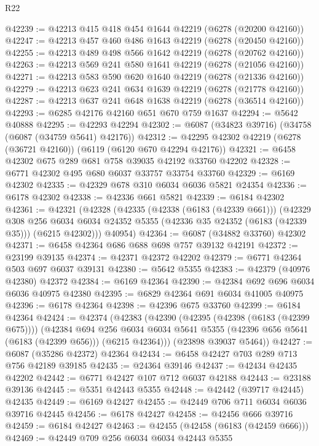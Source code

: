 \begin{lexlean}{R22}
\begin{coremodule}
@42239 := @42213 @415 @418 @454 @1644 @42219 (@6278 (@20200 @42160))
@42247 := @42213 @457 @460 @486 @1643 @42219 (@6278 (@20450 @42160))
@42255 := @42213 @489 @498 @566 @1642 @42219 (@6278 (@20762 @42160))
@42263 := @42213 @569 @241 @580 @1641 @42219 (@6278 (@21056 @42160))
@42271 := @42213 @583 @590 @620 @1640 @42219 (@6278 (@21336 @42160))
@42279 := @42213 @623 @241 @634 @1639 @42219 (@6278 (@21778 @42160))
@42287 := @42213 @637 @241 @648 @1638 @42219 (@6278 (@36514 @42160))
@42293 := @6285 @42176 @42160 @651 @670 @759 @1637
@42294 := @5642 @40888
@42295 := @42293 @42294
@42302 := @6087 (@34823 @39716) (@34758 (@6087 (@34759 @5641) @42176))
@42312 := @42295 @42302 @42219 (@6278 (@36721 @42160)) (@6119 (@6120 @670 @42294 @42176))
@42321 := @6458 @42302 @675 @289 @681 @758 @39035 @42192 @33760 @42202
@42328 := @6771 @42302 @495 @680 @6037 @33757 @33754 @33760
@42329 := @6169 @42302
@42335 := @42329 @678 @310 @6034 @6036 @5821 @24354
@42336 := @6178 @42302
@42338 := @42336 @661 @5821
@42339 := @6184 @42302
@42361 := @42321
    (@42328
      (@42335
        (@42338 (@6183 (@42339 @661)))
        (@42329
          @308
          @256
          @6034
          @6034
          @24352
          @5355
          (@42336 @35 @24352 (@6183 (@42339 @35)))
          (@6215 @42302)))
      @40954)
@42364 := @6087 (@34882 @33760) @42302
@42371 := @6458 @42364 @686 @688 @698 @757 @39132 @42191
@42372 := @23199 @39135
@42374 := @42371 @42372 @42202
@42379 := @6771 @42364 @503 @697 @6037 @39131
@42380 := @5642 @5355
@42383 := @42379 (@40976 @42380) @42372
@42384 := @6169 @42364
@42390 := @42384 @692 @696 @6034 @6036 @40975 @42380
@42395 := @6829 @42364 @691 @6034 @41005 @40975
@42396 := @6178 @42364
@42398 := @42396 @675 @33760
@42399 := @6184 @42364
@42424 := @42374
    (@42383
      (@42390
        (@42395 (@42398 (@6183 (@42399 @675))))
        (@42384
          @694
          @256
          @6034
          @6034
          @5641
          @5355
          (@42396 @656 @5641 (@6183 (@42399 @656)))
          (@6215 @42364)))
      (@23898 @39037 @5464))
@42427 := @6087 (@35286 @42372) @42364
@42434 := @6458 @42427 @703 @289 @713 @756 @42189 @39185
@42435 := @24364 @39146
@42437 := @42434 @42435 @42202
@42442 := @6771 @42427 @107 @712 @6037 @42188
@42443 := @23188 @39136
@42445 := @5351 @42443 @5355
@42448 := @42442 (@39717 @42445) @42435
@42449 := @6169 @42427
@42455 := @42449 @706 @711 @6034 @6036 @39716 @42445
@42456 := @6178 @42427
@42458 := @42456 @666 @39716
@42459 := @6184 @42427
@42463 := @42455 (@42458 (@6183 (@42459 @666)))
@42469 := @42449 @709 @256 @6034 @6034 @42443 @5355

\end{coremodule}
\end{lexlean}
